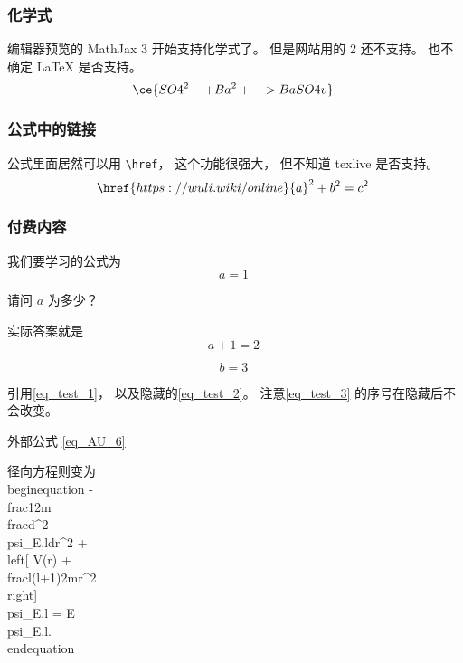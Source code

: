 \subsubsection{化学式}
编辑器预览的 MathJax 3 开始支持化学式了。 但是网站用的 2 还不支持。 也不确定 LaTeX 是否支持。
\begin{equation}
\ce{SO4^2- + Ba^2+ -> BaSO4 v}~
\end{equation}

\subsubsection{公式中的链接}
公式里面居然可以用 \verb|\href|， 这个功能很强大， 但不知道 texlive 是否支持。
\begin{equation}
\href{https://wuli.wiki/online}{a}^2 + b^2 = c^2~
\end{equation}

\subsubsection{付费内容}
我们要学习的公式为
\begin{equation}\label{eq_test_1}
a = 1~
\end{equation}

\begin{example}{}
请问 $a$ 为多少？
\pay

实际答案就是
\begin{equation}\label{eq_test_2}
a + 1 = 2~
\end{equation}
\paid
\end{example}

\begin{equation}\label{eq_test_3}
b = 3~
\end{equation}


引用\autoref{eq_test_1}， 以及隐藏的\autoref{eq_test_2}。 注意\autoref{eq_test_3} 的序号在隐藏后不会改变。

外部公式 \autoref{eq_AU_6}~


径向方程则变为
\\begin{equation}
    -\\frac{1}{2m} \\frac{d^2 \\psi_{E,l}}{dr^2} + \\left[ V(r) + \\frac{l(l+1)}{2mr^2} \\right] \\psi_{E,l} = E \\psi_{E,l}.
\\end{equation}

